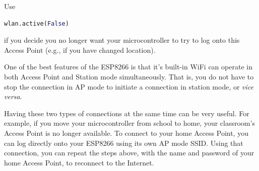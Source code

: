 Use 
\begin{lstlisting}[language=Python]
wlan.active(False)
\end{lstlisting}
if you decide you no longer want your microcontroller to try to log onto this Access Point (e.g., if you have changed location).

\begin{kaobox}[frametitle=WiFi special powers]
	One of the best features of the ESP8266 is that it's built-in WiFi can operate in both Access Point and Station mode simultaneously. 
	That is, you do not have to stop the connection in AP mode to initiate a connection in station mode, or \textit{vice versa}.
	
	Having these two types of connections at the same time can be very useful.
	For example, if you move your microcontroller from school to home, your classroom's Access Point is no longer available.
	To connect to your home Access Point, you can log directly onto your ESP8266 using its own AP mode SSID. 
	Using that connection, you can repeat the steps above, with the name and password of your home Access Point, to reconnect to the Internet.   
\end{kaobox}



